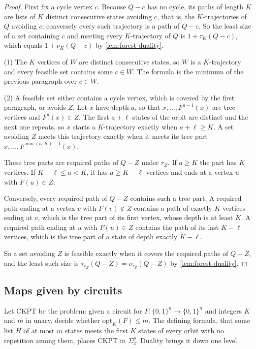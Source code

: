 \documentclass[11pt]{article}
\theoremstyle{definition}
\theoremstyle{remark}
\newcommand{\bits}{\{0,1\}}
\numberwithin{equation}{section}
\begin{document}
\begin{proof}
First fix a cycle vertex $c$.  Because $Q-c$ has no cycle, its paths of
length $K$ are lists of $K$ distinct consecutive states avoiding $c$,
that is, the $K$-trajectories of $Q$ avoiding $c$; conversely every such
trajectory is a path of $Q-c$.  So the least size of a set containing $c$
and meeting every $K$-trajectory of $Q$ is $1+\tau_K(Q-c)$, which equals
$1+\nu_K(Q-c)$ by \cref{lem:forest-duality}.

(1) The $K$ vertices of $W$ are distinct consecutive states, so $W$ is a
$K$-trajectory and every feasible set contains some $c\in W$.  The
formula is the minimum of the previous paragraph over $c\in W$.

(2) A feasible set either contains a cycle vertex, which is covered by
the first paragraph, or avoids $Z$.  Let $x$ have depth $a$, so that
$x,\ldots,F^{a-1}(x)$ are tree vertices and $F^a(x)\in Z$.  The first
$a+\ell$ states of the orbit are distinct and the next one repeats, so
$x$ starts a $K$-trajectory exactly when $a+\ell\geq K$.  A set avoiding
$Z$ meets this trajectory exactly when it meets its tree part
$x,\ldots,F^{\min(a,K)-1}(x)$.

These tree parts are required paths of $Q-Z$ under $r_Z$.  If $a\geq K$
the part has $K$ vertices.  If $K-\ell\leq a<K$, it has $a\geq K-\ell$
vertices and ends at a vertex $u$ with $F(u)\in Z$.

Conversely, every required path of $Q-Z$ contains such a tree part.  A
required path ending at a vertex $v$ with $F(v)\notin Z$ contains a path
of exactly $K$ vertices ending at $v$, which is the tree part of its
first vertex, whose depth is at least $K$.  A required path ending at
$u$ with $F(u)\in Z$ contains the path of its last $K-\ell$ vertices,
which is the tree part of a state of depth exactly $K-\ell$.

So a set avoiding $Z$ is feasible exactly when it covers the required
paths of $Q-Z$, and the least such size is
$\tau_{r_Z}(Q-Z)=\nu_{r_Z}(Q-Z)$ by \cref{lem:forest-duality}.
\end{proof}

\subsection{Maps given by circuits}

Let $\mathrm{CKPT}$ be the problem: given a circuit for
$F:\bits^n\to\bits^n$ and integers $K$ and $m$ in unary, decide whether
$\mathrm{opt}_K(F)\leq m$.  The defining formula, that some list $H$ of at
most $m$ states meets the first $K$ states of every orbit with no
repetition among them, places $\mathrm{CKPT}$ in $\Sigma_2^p$.  Duality
brings it down one level.
\end{document}
